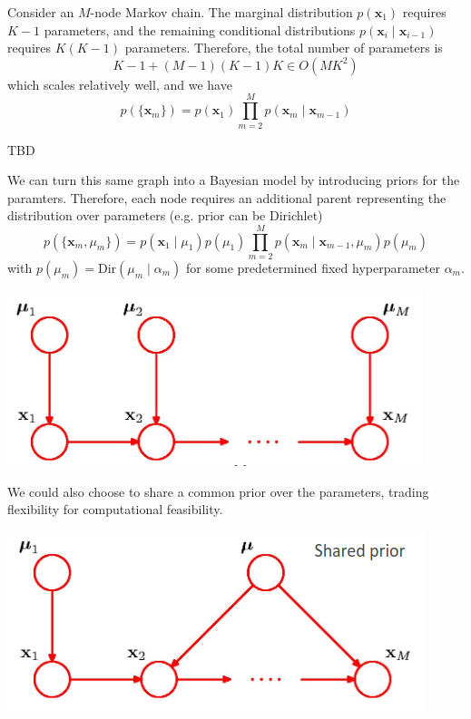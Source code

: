 \documentclass{article}
\begin{document}
      \begin{example}
        Consider an $M$-node Markov chain. The marginal distribution $p(\mathbf{x}_1)$ requires $K-1$ parameters, and the remaining conditional distributions $p(\mathbf{x}_i \mid \mathbf{x}_{i-1})$ requires $K(K-1)$ parameters. Therefore, the total number of parameters is 
        \[K-1 + (M-1) (K-1) K \in O(M K^2)\]
        which scales relatively well, and we have 
        \[p(\{\mathbf{x}_m\}) = p (\mathbf{x}_1) \prod_{m=2}^M p(\mathbf{x}_m \mid \mathbf{x}_{m-1})\]
      \begin{center}
        TBD
      \end{center}
      We can turn this same graph into a Bayesian model by introducing priors for the paramters. Therefore, each node requires an additional parent representing the distribution over parameters (e.g. prior can be Dirichlet)  
      \[p(\{\mathbf{x}_m , \mu_m\}) = p(\mathbf{x}_1 \mid \mu_1) p(\mu_1) \prod_{m=2}^M p(\mathbf{x}_m \mid \mathbf{x}_{m-1}, \mu_m) p(\mu_m) \]
      with $p(\mu_m) = \mathrm{Dir}(\mu_m \mid \alpha_m)$ for some predetermined fixed hyperparameter $\alpha_m$. 
      \begin{center}
        \includegraphics[scale=0.5]{img/07_Boltzmann/dir_prior.png}
      \end{center}
      We could also choose to share a common prior over the parameters, trading flexibility for computational feasibility. 
      \begin{center}
        \includegraphics[scale=0.5]{img/07_Boltzmann/shared_dir_prior.png}
      \end{center}
      \end{example}
\end{document}
